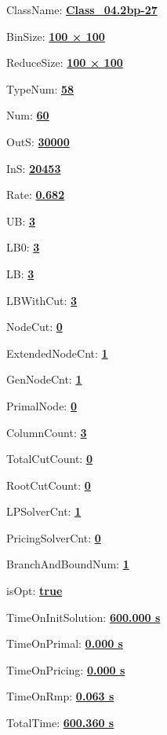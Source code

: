 \documentclass[11pt]{article}
\begin{document}
\pagestyle{empty}


ClassName: \underline{\textbf{Class_04.2bp-27}}
\par
BinSize: \underline{\textbf{100 × 100}}
\par
ReduceSize: \underline{\textbf{100 × 100}}
\par
TypeNum: \underline{\textbf{58}}
\par
Num: \underline{\textbf{60}}
\par
OutS: \underline{\textbf{30000}}
\par
InS: \underline{\textbf{20453}}
\par
Rate: \underline{\textbf{0.682}}
\par
UB: \underline{\textbf{3}}
\par
LB0: \underline{\textbf{3}}
\par
LB: \underline{\textbf{3}}
\par
LBWithCut: \underline{\textbf{3}}
\par
NodeCut: \underline{\textbf{0}}
\par
ExtendedNodeCnt: \underline{\textbf{1}}
\par
GenNodeCnt: \underline{\textbf{1}}
\par
PrimalNode: \underline{\textbf{0}}
\par
ColumnCount: \underline{\textbf{3}}
\par
TotalCutCount: \underline{\textbf{0}}
\par
RootCutCount: \underline{\textbf{0}}
\par
LPSolverCnt: \underline{\textbf{1}}
\par
PricingSolverCnt: \underline{\textbf{0}}
\par
BranchAndBoundNum: \underline{\textbf{1}}
\par
isOpt: \underline{\textbf{true}}
\par
TimeOnInitSolution: \underline{\textbf{600.000 s}}
\par
TimeOnPrimal: \underline{\textbf{0.000 s}}
\par
TimeOnPricing: \underline{\textbf{0.000 s}}
\par
TimeOnRmp: \underline{\textbf{0.063 s}}
\par
TotalTime: \underline{\textbf{600.360 s}}
\par
\newpage
\end{document}

